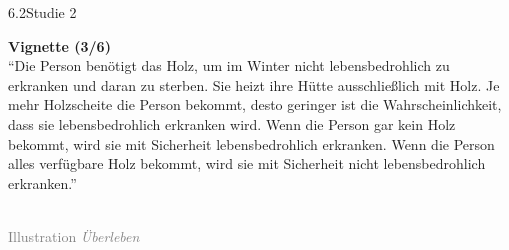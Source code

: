 \documentclass[xcolor=table,9pt,aspectratio=169]{beamer}
\begin{document}
\begin{frame}{\vspace*{10mm}6.2\hspace*{1em}Studie 2}
\begin{multicols}{2}
   \textbf{Vignette (3/6)}\\
   \medskip
   \enquote{Die Person benötigt das Holz, um im Winter nicht lebensbedrohlich zu erkranken und daran zu sterben. Sie heizt ihre Hütte ausschließlich mit Holz. Je mehr Holzscheite die Person bekommt, desto geringer ist die Wahrscheinlichkeit, dass sie lebensbedrohlich erkranken wird. Wenn die Person gar kein Holz bekommt, wird sie mit Sicherheit lebensbedrohlich erkranken. Wenn die Person alles verfügbare Holz bekommt, wird sie mit Sicherheit nicht lebensbedrohlich erkranken.}\\
   \vfill
   \begin{center}
      \\
      \textcolor{gray}{Illustration \textit{Überleben}}
   \end{center}
\end{multicols}
\end{frame}
\end{document}
